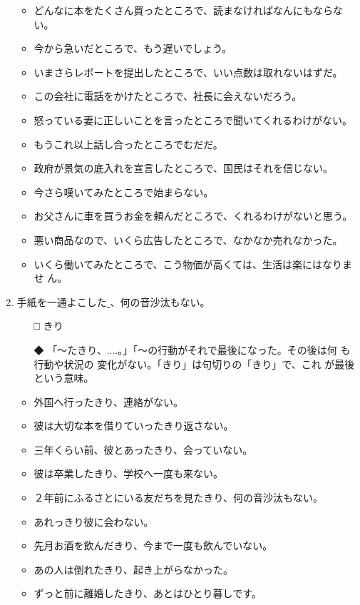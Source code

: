 \documentclass[
uplatex,
b5paper,
10pt,
dvipdfmx
]{jsbook}
\begin{document}
\begin{enumerate}
\begin{itemize}
\item どんなに本をたくさん買ったところで、読まなければなんにもならない。
\item 今から急いだところで、もう遅いでしょう。
\item いまさらレポートを提出したところで、いい点数は取れないはずだ。
\item この会社に電話をかけたところで、社長に会えないだろう。
\item 怒っている妻に正しいことを言ったところで聞いてくれるわけがない。
\item もうこれ以上話し合ったところでむだだ。
\item 政府が景気の底入れを宣言したところで、国民はそれを信じない。
\item 今さら嘆いてみたところで始まらない。
\item お父さんに車を買うお金を頼んだところで、くれるわけがないと思う。
\item 悪い商品なので、いくら広告したところで、なかなか売れなかった。
\item いくら働いてみたところで、こう物価が高くては、生活は楽にはなりませ
      ん。
\end{itemize}

\item 手紙を一通よこした\underline{  }、何の音沙汰もない。
\begin{itemize}
\item[□] きり
\item[◆] 「〜たきり、....。」「〜の行動がそれで最後になった。その後は何
	  も行動や状況の 変化がない。「きり」は句切りの「きり」で、これ
	  が最後という意味。
\end{itemize}

\begin{itemize}
\item 外国へ行ったきり、連絡がない。
\item 彼は大切な本を借りていったきり返さない。
\item 三年くらい前、彼とあったきり、会っていない。
\item 彼は卒業したきり、学校へ一度も来ない。
\item ２年前にふるさとにいる友だちを見たきり、何の音沙汰もない。
\item あれっきり彼に会わない。
\item 先月お酒を飲んだきり、今まで一度も飲んでいない。
\item あの人は倒れたきり、起き上がらなかった。
\item ずっと前に離婚したきり、あとはひとり暮しです。
\end{itemize}


\end{enumerate}
\end{document}
